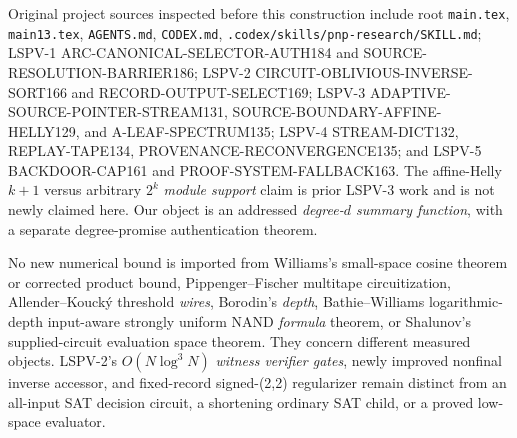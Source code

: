\documentclass[11pt]{article}
\begin{document}
Original project sources inspected before this construction include root \texttt{main.tex}, \texttt{main13.tex}, \texttt{AGENTS.md}, \texttt{CODEX.md}, \texttt{.codex/skills/pnp-research/SKILL.md}; LSPV-1 ARC-CANONICAL-SELECTOR-AUTH184 and SOURCE-RESOLUTION-BARRIER186; LSPV-2 CIRCUIT-OBLIVIOUS-INVERSE-SORT166 and RECORD-OUTPUT-SELECT169; LSPV-3 ADAPTIVE-SOURCE-POINTER-STREAM131, SOURCE-BOUNDARY-AFFINE-HELLY129, and A-LEAF-SPECTRUM135; LSPV-4 STREAM-DICT132, REPLAY-TAPE134, PROVENANCE-RECONVERGENCE135; and LSPV-5 BACKDOOR-CAP161 and PROOF-SYSTEM-FALLBACK163. The affine-Helly $k+1$ versus arbitrary $2^k$ \emph{module support} claim is prior LSPV-3 work and is not newly claimed here. Our object is an addressed \emph{degree-$d$ summary function}, with a separate degree-promise authentication theorem.

No new numerical bound is imported from Williams's small-space cosine theorem or corrected product bound, Pippenger--Fischer multitape circuitization, Allender--Kouck\'y threshold \emph{wires}, Borodin's \emph{depth}, Bathie--Williams logarithmic-depth input-aware strongly uniform NAND \emph{formula} theorem, or Shalunov's supplied-circuit evaluation space theorem. They concern different measured objects. LSPV-2's $O(N\log^3 N)$ \emph{witness verifier gates}, newly improved nonfinal inverse accessor, and fixed-record signed-(2,2) regularizer remain distinct from an all-input SAT decision circuit, a shortening ordinary SAT child, or a proved low-space evaluator.
\end{document}
